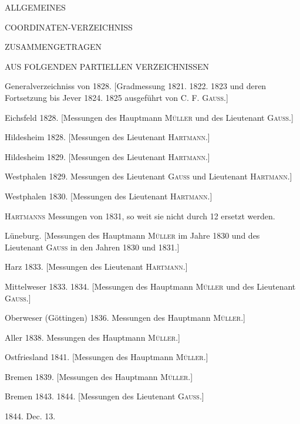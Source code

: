 \clearpage{}%
\thispagestyle{empty}
\begin{center}\Large ALLGEMEINES\par\medskip COORDINATEN-VERZEICHNISS\par\bigskip
\normalsize ZUSAMMENGETRAGEN\par\medskip AUS FOLGENDEN PARTIELLEN VERZEICHNISSEN\end{center}
\smallskip
\begin{list}{}{\setlength{\leftmargin}{2.5em}\setlength{\labelwidth}{2.3em}\setlength{\labelsep}{.2em}\setlength{\itemsep}{3pt}\setlength{\parsep}{0pt}}
\item[Nr. 1)] Generalverzeichniss von 1828. [Gradmessung 1821. 1822. 1823 und deren Fortsetzung bis Jever 1824. 1825 ausgeführt von C. F. \textsc{Gauss}.]
\item[2)] Eichsfeld 1828. [Messungen des Hauptmann \textsc{Müller} und des Lieutenant \textsc{Gauss}.]
\item[3)] Hildesheim 1828. [Messungen des Lieutenant \textsc{Hartmann}.]
\item[4)] Hildesheim 1829. [Messungen des Lieutenant \textsc{Hartmann}.]
\item[5)] Westphalen 1829. Messungen des Lieutenant \textsc{Gauss} und Lieutenant \textsc{Hartmann}.]
\item[6)] Westphalen 1830. [Messungen des Lieutenant \textsc{Hartmann}.]
\item[6*)] \textsc{Hartmanns} Messungen von 1831, so weit sie nicht durch 12 ersetzt werden.
\item[7)] Lüneburg. [Messungen des Hauptmann \textsc{Müller} im Jahre 1830 und des Lieutenant \textsc{Gauss} in den Jahren 1830 und 1831.]
\item[8)] Harz 1833. [Messungen des Lieutenant \textsc{Hartmann}.]
\item[9)] Mittelweser 1833. 1834. [Messungen des Hauptmann \textsc{Müller} und des Lieutenant \textsc{Gauss}.]
\item[10)] Oberweser (Göttingen) 1836. Messungen des Hauptmann \textsc{Müller}.]
\item[11)] Aller 1838. Messungen des Hauptmann \textsc{Müller}.]
\item[12)] Ostfriesland 1841. [Messungen des Hauptmann \textsc{Müller}.]
\item[13)] Bremen 1839. [Messungen des Hauptmann \textsc{Müller}.]
\item[14)] Bremen 1843. 1844. [Messungen des Lieutenant \textsc{Gauss}.]
\end{list}
\begin{center}1844. Dec. 13.\end{center}
